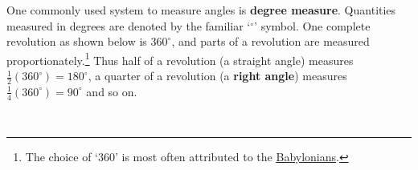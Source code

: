 \documentclass[12pt]{ximera}
\begin{document}
\[ %
  \]

One commonly used system to measure angles is \textbf{degree measure}.  Quantities measured in degrees are denoted by the familiar `$^{\circ}$' symbol.  One complete revolution as shown below is $360^{\circ}$, and parts of a revolution are measured proportionately.\footnote{The choice of `$360$' is most often attributed to the \href{http://en.wikipedia.org/wiki/Degree_(angle)}{\underline{Babylonians}}.}  Thus half of a revolution (a straight angle) measures $\frac{1}{2} \left(360^{\circ}\right) = 180^{\circ}$, a quarter of a revolution (a \textbf{right angle}) measures $\frac{1}{4} \left(360^{\circ}\right) = 90^{\circ}$ and so on.

\[ \begin{array}{ccc}

 

&

\hspace{.5in}

 

&

\hspace{.5in}

 

\\  \end{array} \]
\end{document}
